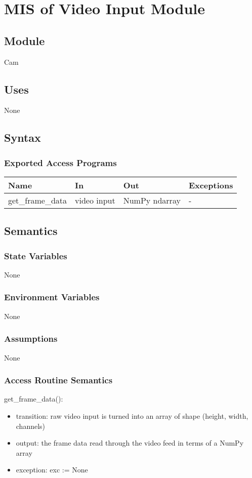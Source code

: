 \documentclass[12pt, titlepage]{article}
\begin{document}
\newpage

\section{MIS of Video Input Module} \label{Module} 
\subsection{Module}
Cam
\subsection{Uses}
None
\subsection{Syntax}
\subsubsection{Exported Access Programs}
\begin{center}
\begin{tabular}{p{4cm} p{3cm} p{4cm} p{2cm}}
\hline
\textbf{Name} & \textbf{In} & \textbf{Out} & \textbf{Exceptions} \\
\hline
get\_frame\_data & video input & NumPy ndarray & - \\
\hline
\end{tabular}
\end{center}
\subsection{Semantics}
\subsubsection{State Variables}
None
\subsubsection{Environment Variables}
None
\subsubsection{Assumptions}
None
\subsubsection{Access Routine Semantics}
get\_frame\_data():
\begin{itemize}
    \item transition: raw video input is turned into an array of shape (height, width, channels)
    \item output: the frame data read through the video feed in terms of a NumPy array
    \item exception: exc := None
\end{itemize}
\end{document}

